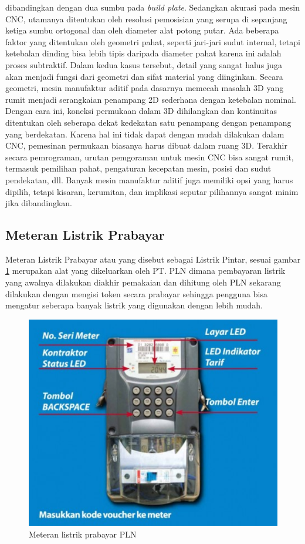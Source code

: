 dibandingkan dengan dua sumbu pada \textit{build plate}.  Sedangkan akurasi pada mesin CNC, utamanya ditentukan oleh resolusi pemosisian yang serupa di sepanjang ketiga sumbu ortogonal dan oleh diameter alat potong putar. Ada beberapa faktor yang ditentukan oleh geometri pahat, seperti jari-jari sudut internal, tetapi ketebalan dinding bisa lebih tipis daripada diameter pahat karena ini adalah proses subtraktif. Dalam kedua kasus tersebut, detail yang sangat halus juga akan menjadi fungsi dari geometri dan sifat material yang diinginkan. Secara geometri, mesin manufaktur aditif pada dasarnya memecah masalah 3D yang rumit menjadi serangkaian penampang 2D sederhana dengan ketebalan nominal. Dengan cara ini, koneksi permukaan dalam 3D dihilangkan dan kontinuitas ditentukan oleh seberapa dekat kedekatan satu penampang dengan penampang yang berdekatan. Karena hal ini tidak dapat dengan mudah dilakukan dalam CNC, pemesinan permukaan biasanya harus dibuat dalam ruang 3D. Terakhir secara pemrograman, urutan pemgoraman untuk mesin CNC bisa sangat rumit, termasuk pemilihan pahat, pengaturan kecepatan mesin, posisi dan sudut pendekatan, dll. Banyak mesin manufaktur aditif juga memiliki opsi yang harus dipilih, tetapi kisaran, kerumitan, dan implikasi seputar pilihannya sangat minim jika dibandingkan. \parencite{3dprinting}

\newpage
\subsection{Meteran Listrik Prabayar}
Meteran Listrik Prabayar atau yang disebut sebagai Listrik Pintar, sesuai gambar \ref{fig:meteran-prabayar} merupakan alat yang dikeluarkan oleh PT. PLN dimana pembayaran listrik yang awalnya dilakukan diakhir pemakaian dan dihitung oleh PLN sekarang dilakukan dengan mengisi token secara prabayar sehingga pengguna bisa mengatur seberapa banyak listrik yang digunakan dengan lebih mudah.

\begin{figure}[H]
    \centering
    \includegraphics[width=0.5\linewidth]{gambar/meteran-prabayar.png}
    \caption{Meteran listrik prabayar PLN}
    \label{fig:meteran-prabayar}
\end{figure}

